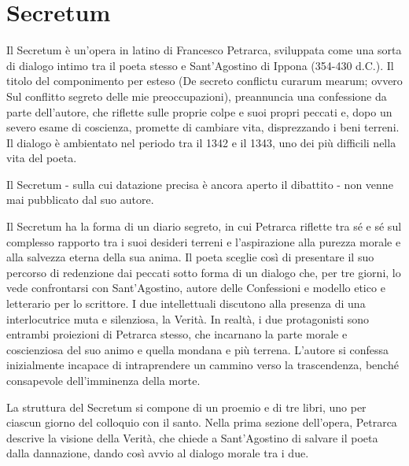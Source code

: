 \documentclass[10pt,a4paper]{article}
\begin{document}
\section{Secretum}

Il Secretum è un’opera in latino di Francesco Petrarca, sviluppata come una sorta di dialogo intimo tra il poeta stesso e Sant'Agostino di Ippona (354-430 d.C.). Il titolo del componimento per esteso (De secreto conflictu curarum mearum; ovvero Sul conflitto segreto delle mie preoccupazioni), preannuncia una confessione da parte dell’autore, che riflette sulle proprie colpe e suoi propri peccati e, dopo un severo esame di coscienza, promette di cambiare vita, disprezzando i beni terreni. Il dialogo è ambientato nel periodo tra il 1342 e il 1343, uno dei più difficili nella vita del poeta.

Il Secretum - sulla cui datazione precisa è ancora aperto il dibattito - non venne mai pubblicato dal suo autore.

Il Secretum ha la forma di un diario segreto, in cui Petrarca riflette tra sé e sé sul complesso rapporto tra i suoi desideri terreni e l’aspirazione alla purezza morale e alla salvezza eterna della sua anima. Il poeta sceglie così di presentare il suo percorso di redenzione dai peccati sotto forma di un dialogo che, per tre giorni, lo vede confrontarsi con Sant’Agostino, autore delle Confessioni e modello etico e letterario per lo scrittore. I due intellettuali discutono alla presenza di una interlocutrice muta e silenziosa, la Verità. In realtà, i due protagonisti sono entrambi proiezioni di Petrarca stesso, che incarnano la parte morale e coscienziosa del suo animo e quella mondana e più terrena. L’autore si confessa inizialmente incapace di intraprendere un cammino verso la trascendenza, benché consapevole dell’imminenza della morte.

La struttura del Secretum si compone di un proemio e di tre libri, uno per ciascun giorno del colloquio con il santo. Nella prima sezione dell’opera, Petrarca descrive la visione della Verità, che chiede a Sant’Agostino di salvare il poeta dalla dannazione, dando così avvio al dialogo morale tra i due.
\end{document}
